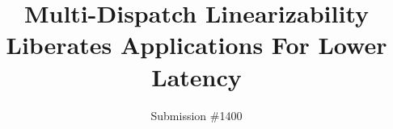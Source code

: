 \documentclass[letterpaper,twocolumn,10pt]{article}
\begin{document}


\date{}

\title{\Large \bf Multi-Dispatch Linearizability Liberates Applications For Lower Latency}

\author{
{\rm Submission \#1400}
} %

\maketitle






















\clearpage
\appendix

% 

\end{document}
